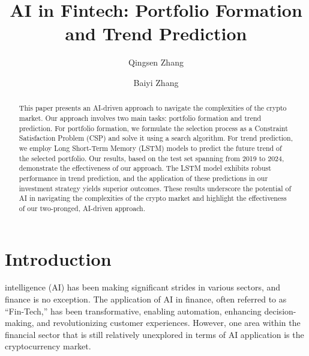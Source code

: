 \documentclass[journal]{IEEEtran}
\begin{document}
\title{{\Large \textbf{AI in Fintech: Portfolio Formation and Trend Prediction}}}

\author[1]{Qingsen Zhang}
\author[1]{Baiyi Zhang}


\maketitle

\begin{abstract}
This paper presents an AI-driven approach to navigate the complexities of the crypto market. Our approach involves two main tasks: portfolio formation and trend prediction. For portfolio formation, we formulate the selection process as a Constraint Satisfaction Problem (CSP) and solve it using a search algorithm. For trend prediction, we employ Long Short-Term Memory (LSTM) models to predict the future trend of the selected portfolio. Our results, based on the test set spanning from 2019 to 2024, demonstrate the effectiveness of our approach. The LSTM model exhibits robust performance in trend prediction, and the application of these predictions in our investment strategy yields superior outcomes. These results underscore the potential of AI in navigating the complexities of the crypto market and highlight the effectiveness of our two-pronged, AI-driven approach.
\end{abstract}


\section{Introduction}
 intelligence (AI) has been making significant strides in various sectors, and finance is no exception. The application of AI in finance, often referred to as “Fin-Tech,” has been transformative, enabling automation, enhancing decision-making, and revolutionizing customer experiences\cite{bartram2020artificial}. However, one area within the financial sector that is still relatively unexplored in terms of AI application is the cryptocurrency market.
\end{document}
